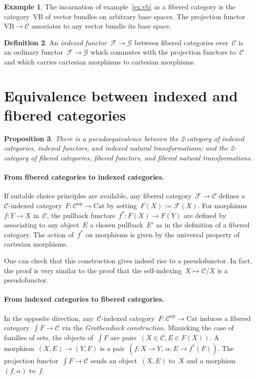 \documentclass[a4paper,english,12pt]{scrartcl}
\theoremstyle{definition}
\newtheorem{defn}{Definition}[section]
\newtheorem{ex}[defn]{Example}
\theoremstyle{plain}
\newtheorem{prop}[defn]{Proposition}
\theoremstyle{remark}
\newcommand{\C}{\mathcal{C}}
\newcommand{\F}{\mathcal{F}}
\newcommand{\G}{\mathcal{G}}
\newcommand{\op}{\mathrm{op}}
\newcommand{\Cat}{\mathrm{Cat}}
\newcommand{\VB}{\mathrm{VB}}
\begin{document}
\begin{ex}The incarnation of example~\ref{ex:vb} as a fibered category is the
category~$\VB$ of vector bundles on arbitrary base spaces. The projection
functor~$\VB \to \C$ associates to any vector bundle its base space.\end{ex}

\begin{defn}An \emph{indexed functor}~$\F \to \G$ between fibered categories
over~$\C$ is an ordinary functor~$\F \to \G$ which commutes with the projection
functors to~$\C$ and which carries cartesian morphisms to cartesian
morphisms.\end{defn}


\section{Equivalence between indexed and fibered categories}

\begin{prop}There is a pseudoequivalence between the 2-category of indexed
categories, indexed functors, and indexed natural transformations; and the
2-category of fibered categories, fibered functors, and fibered natural
transformations.\end{prop}

\paragraph{From fibered categories to indexed categories.}
If suitable choice principles are available, any fibered category~$\F \to \C$
defines a~$\C$-indexed category~$F : \C^\op \to \Cat$ by setting~$F(X) :=
\F(X)$. For morphisms~$f : Y \to X$ in~$\C$, the pullback functors~$f^* : F(X)
\to F(Y)$ are defined by associating to any object~$E$ a chosen pullback~$E'$
as in the definition of a fibered category. The action of~$f^*$ on morphisms
is given by the universal property of cartesian morphisms.

One can check that this construction gives indeed rise to a pseudofunctor. In
fact, the proof is very similar to the proof that the self-indexing~$X \mapsto
\C/X$ is a pseudofunctor.

\paragraph{From indexed categories to fibered categories.}
In the opposite direction, any~$\C$-indexed category~$F : \C^\op \to \Cat$
induces a fibered category~$\int F \to \C$ via the \emph{Grothendieck
construction}. Mimicking the case of families of sets, the objects of~$\int F$
are pairs~$(X \in \C, E \in F(X))$. A morphism~$(X,E) \to (Y,F)$ is a pair~$(f
: X \to Y,\ \alpha : E \to f^*(F))$. The projection functor~$\int F \to \C$
sends an object~$(X,E)$ to~$X$ and a morphism~$(f,\alpha)$ to~$f$.
\end{document}

